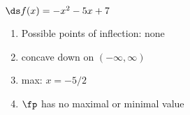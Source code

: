 {$\ds f(x) = -x^2-5x+7$
}
{\begin{enumerate}[label=(\alph*)]
\item Possible points of inflection: none
\item concave down on $(-\infty,\infty)$
\item max: $x=-5/2$
\item $\fp$ has no maximal or minimal value
\end{enumerate}}
